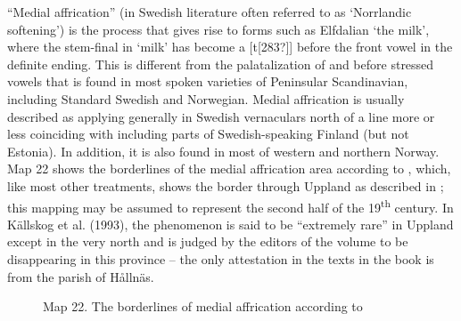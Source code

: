 “Medial affrication” (in Swedish literature often referred to as  ‘Norrlandic softening’) is the process that gives rise to forms such as Elfdalian  ‘the milk’, where the stem-final  in  ‘milk’ has become a [t[283?]] before the front vowel in the definite ending. This is different from the palatalization of  and  before stressed vowels that is found in most spoken varieties of Peninsular Scandinavian, including Standard Swedish and Norwegian. Medial affrication is usually described as applying generally in Swedish vernaculars north of a line more or less coinciding with  including parts of Swedish-speaking Finland (but not Estonia). In addition, it is also found in most of western and northern Norway. Map 22 shows the borderlines of the medial affrication area according to \citet{Haugen1970}, which, like most other treatments, shows the border through Uppland as described in \citet{Kruuse1908}; this mapping may be assumed to represent the second half of the 19\textsuperscript{th} century. In Källskog et al. (1993), the phenomenon is said to be “extremely rare” in Uppland except in the very north and is judged by the editors of the volume to be disappearing in this province – the only attestation in the texts in the book is from the parish of Hållnäs. 


\begin{figure}[h]

\begin{minipage}{4.46319in}

\label{bkm:Ref130034367}Map 22. The borderlines of medial affrication according to \citet{Haugen1970}


\end{minipage}

\end{figure}

